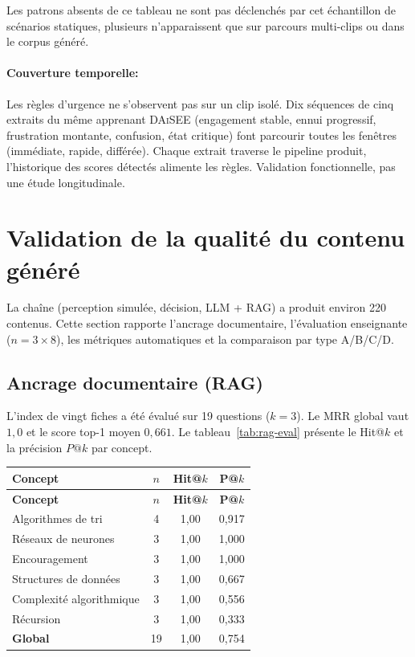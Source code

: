 Les patrons absents de ce tableau ne sont pas déclenchés par cet
échantillon de scénarios statiques, plusieurs n'apparaissent que sur
parcours multi-clips ou dans le corpus généré.

\paragraph{Couverture temporelle:} Les règles d'urgence ne s'observent
pas sur un clip isolé. Dix séquences de cinq extraits du même
apprenant \textsc{DAiSEE} (engagement stable, ennui progressif,
frustration montante, confusion, état critique) font parcourir toutes
les fenêtres (immédiate, rapide, différée). Chaque extrait traverse le
pipeline produit, l'historique des scores détectés alimente les
règles. Validation fonctionnelle, pas une étude longitudinale.

\section{Validation de la qualité du contenu généré}
\label{sec:val-contenu}

La chaîne (perception simulée, décision, LLM + RAG) a produit environ
220 contenus. Cette section rapporte l'ancrage documentaire,
l'évaluation enseignante ($n=3\times 8$), les métriques automatiques et
la comparaison par type A/B/C/D.

\subsection{Ancrage documentaire (RAG)}
\label{subsec:val-rag}

L'index de vingt fiches a été évalué sur 19 questions ($k=3$).
Le MRR global vaut $1{,}0$ et le score top-1
moyen $0{,}661$. Le tableau~\ref{tab:rag-eval} présente le Hit@$k$ et la précision
$P@k$ par concept.

{\small
\renewcommand{\arraystretch}{1.18}
\setlength{\tabcolsep}{4pt}
\begin{xltabular}{\textwidth}{|>{\raggedright\arraybackslash}X|c|c|c|}
\hline
{}
\textbf{Concept} & \textbf{$n$} & \textbf{Hit@$k$} & \textbf{P@$k$} \\
\hline
\endfirsthead
\hline
{}
\textbf{Concept} & \textbf{$n$} & \textbf{Hit@$k$} & \textbf{P@$k$} \\
\hline
\endhead
\endfoot
\endlastfoot
Algorithmes de tri & 4 & 1{,}00 & 0{,}917 \\
\hline
Réseaux de neurones & 3 & 1{,}00 & 1{,}000 \\
\hline
Encouragement & 3 & 1{,}00 & 1{,}000 \\
\hline
Structures de données & 3 & 1{,}00 & 0{,}667 \\
\hline
Complexité algorithmique & 3 & 1{,}00 & 0{,}556 \\
\hline
Récursion & 3 & 1{,}00 & 0{,}333 \\
\hline
\textbf{Global} & 19 & 1{,}00 & 0{,}754 \\
\hline
\end{xltabular}
\label{tab:rag-eval}
}


